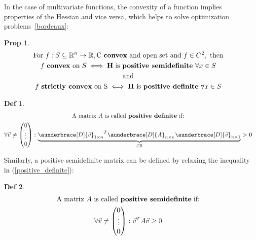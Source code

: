 \documentclass[../convex_optimization.tex]{subfiles}
\theoremstyle{definition} \newtheorem{defi}{Def}
\theoremstyle{definition} \newtheorem{prop}{Prop}
\begin{document}
In the case of multivariate functions, the convexity of a function
implies properties of the Hessian and vice versa, which
helps to solve optimization problems~\ref{bordeaux}:
\begin{prop}
\begin{gather}
    \text{For } f: S \subseteq \mathbb R^n \to \mathbb R,
    \text{C \textbf{convex} and open set and } f \in C^2,
    \text{ then}\nonumber\\
    f \text{ \textbf{convex} on }S \iff
    \mathbf H \text{ is \textbf{positive semidefinite} } \forall x \in S\label{hessian_convex}\\
    \text{and}\nonumber\\
    f \text{ \textbf{strictly convex} on S} \iff
    \mathbf H \text{ is \textbf{positive definite} } \forall x \in S
\end{gather}
\end{prop}
\begin{defi}
\begin{gather}
    \text{A matrix $A$ is called \textbf{positive definite} if:}
    \nonumber\\
    \forall \vec{v} \neq 
    \begin{pmatrix} 0 \\ \vdots \\ 0
    \end{pmatrix}\colon
    \rlap{\ensuremath{\underbrace{\phantom{
                    {\aunderbrace[D]{\vec{v}}_{1\times n}}^T
                    \aunderbrace[D]{A}_{n\times n}
                    \aunderbrace[D]{\vec{v}}_{n\times 1}
    }}_{\in \mathbb R}}}
    {\aunderbrace[D]{\vec{v}}_{1\times n}}^T
    \aunderbrace[D]{A}_{n\times n}
    \aunderbrace[D]{\vec{v}}_{n\times 1}
    > 0
    \label{positive_definite}
\end{gather}
\end{defi}
Similarly, a positive semidefinite matrix can be defined by relaxing the inequality in (\ref{positive_definite}):
\begin{defi}
\begin{gather}
    \text{A matrix $A$ is called \textbf{positive semidefinite} if:}
    \nonumber\\
    \forall \vec{v} \neq 
    \begin{pmatrix} 0 \\ \vdots \\ 0
    \end{pmatrix}\colon
    \vec{v}^T\space A\space \vec{v} \geq 0
\end{gather}
\end{defi}
\end{document}

